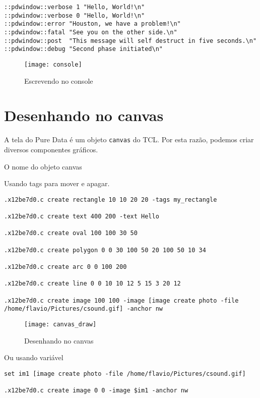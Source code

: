 \begin{lstlisting}[caption=Escrevendo no console]
::pdwindow::verbose 1 "Hello, World!\n"
::pdwindow::verbose 0 "Hello, World!\n"
::pdwindow::error "Houston, we have a problem!\n"
::pdwindow::fatal "See you on the other side.\n"
::pdwindow::post  "This message will self destruct in five seconds.\n"
::pdwindow::debug "Second phase initiated\n"
\end{lstlisting}

\begin{figure}[ht!]
	\centering
	\texttt{[image: console]}
	\caption{Escrevendo no console}
\end{figure}

\section{Desenhando no canvas}

A tela do Pure Data é um objeto \texttt{canvas} do TCL.
Por esta razão, podemos criar diversos componentes gráficos.

O nome do objeto canvas

Usando tags para mover e apagar.

\begin{lstlisting}
.x12be7d0.c create rectangle 10 10 20 20 -tags my_rectangle

.x12be7d0.c create text 400 200 -text Hello

.x12be7d0.c create oval 100 100 30 50

.x12be7d0.c create polygon 0 0 30 100 50 20 100 50 10 34

.x12be7d0.c create arc 0 0 100 200

.x12be7d0.c create line 0 0 10 10 12 5 15 3 20 12

.x12be7d0.c create image 100 100 -image [image create photo -file /home/flavio/Pictures/csound.gif] -anchor nw
\end{lstlisting}

\begin{figure}[ht!]
	\centering
	\texttt{[image: canvas\_draw]}
	\caption{Desenhando no canvas}
\end{figure}

Ou usando variável

\begin{lstlisting}
set im1 [image create photo -file /home/flavio/Pictures/csound.gif]

.x12be7d0.c create image 0 0 -image $im1 -anchor nw
\end{lstlisting}

